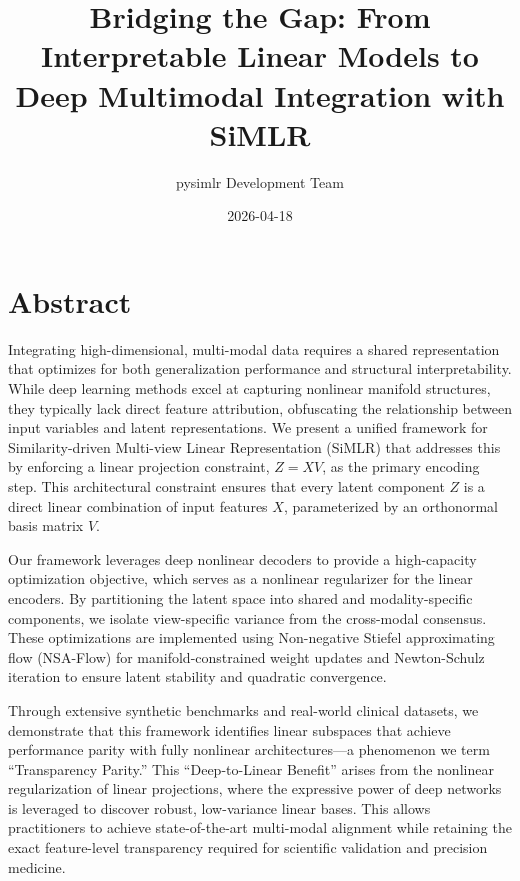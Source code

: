 \documentclass[
  letterpaper,
]{report}
\title{Bridging the Gap: From Interpretable Linear Models to Deep
Multimodal Integration with SiMLR}
\author{pysimlr Development Team}
\date{2026-04-18}
\renewcommand*\contentsname{Table of contents}
\newcommand\contentsname{Table of contents}
\begin{document}
\maketitle

\renewcommand*\contentsname{Table of contents}
{
\setcounter{tocdepth}{2}
\tableofcontents
}


\chapter*{Abstract}\label{abstract}


Integrating high-dimensional, multi-modal data requires a shared
representation that optimizes for both generalization performance and
structural interpretability. While deep learning methods excel at
capturing nonlinear manifold structures, they typically lack direct
feature attribution, obfuscating the relationship between input
variables and latent representations. We present a unified framework for
Similarity-driven Multi-view Linear Representation (SiMLR) that
addresses this by enforcing a linear projection constraint, \(Z = XV\),
as the primary encoding step. This architectural constraint ensures that
every latent component \(Z\) is a direct linear combination of input
features \(X\), parameterized by an orthonormal basis matrix \(V\).

Our framework leverages deep nonlinear decoders to provide a
high-capacity optimization objective, which serves as a nonlinear
regularizer for the linear encoders. By partitioning the latent space
into shared and modality-specific components, we isolate view-specific
variance from the cross-modal consensus. These optimizations are
implemented using Non-negative Stiefel approximating flow (NSA-Flow) for
manifold-constrained weight updates and Newton-Schulz iteration to
ensure latent stability and quadratic convergence.

Through extensive synthetic benchmarks and real-world clinical datasets,
we demonstrate that this framework identifies linear subspaces that
achieve performance parity with fully nonlinear architectures---a
phenomenon we term ``Transparency Parity.'' This ``Deep-to-Linear
Benefit'' arises from the nonlinear regularization of linear
projections, where the expressive power of deep networks is leveraged to
discover robust, low-variance linear bases. This allows practitioners to
achieve state-of-the-art multi-modal alignment while retaining the exact
feature-level transparency required for scientific validation and
precision medicine.
\end{document}
